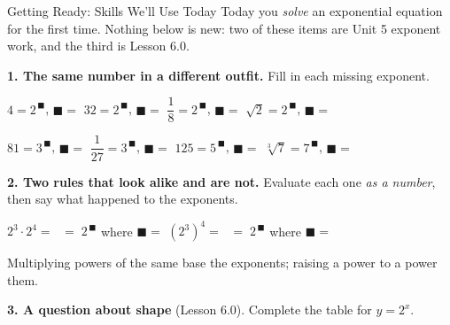 \documentclass[10pt]{article}
\begin{document}
\namedateperiod

\vspace{0.10in}

\begin{notesbox}{Getting Ready: Skills We'll Use Today}
\small Today you \emph{solve} an exponential equation for the first time. Nothing below is new: two of
these items are Unit 5 exponent work, and the third is Lesson 6.0.

\vspace{5pt}
\textbf{1. The same number in a different outfit.} Fill in each missing exponent.

\vspace{4pt}
\hspace*{1.2em} $4 = 2^{\,\blacksquare}$, \; $\blacksquare=$ \blank{1.1cm} \qquad
$32 = 2^{\,\blacksquare}$, \; $\blacksquare=$ \blank{1.1cm} \qquad
$\dfrac{1}{8} = 2^{\,\blacksquare}$, \; $\blacksquare=$ \blank{1.1cm} \qquad
$\sqrt{2} = 2^{\,\blacksquare}$, \; $\blacksquare=$ \blank{1.1cm}

\vspace{5pt}
\hspace*{1.2em} $81 = 3^{\,\blacksquare}$, \; $\blacksquare=$ \blank{1.1cm} \qquad
$\dfrac{1}{27} = 3^{\,\blacksquare}$, \; $\blacksquare=$ \blank{1.1cm} \qquad
$125 = 5^{\,\blacksquare}$, \; $\blacksquare=$ \blank{1.1cm} \qquad
$\sqrt[3]{7} = 7^{\,\blacksquare}$, \; $\blacksquare=$ \blank{1.1cm}

\vspace{0.32in}

\textbf{2. Two rules that look alike and are not.} Evaluate each one \emph{as a number}, then say what
happened to the exponents.

\vspace{4pt}
\hspace*{1.2em} $2^{3}\cdot 2^{4} =$ \blank{1.8cm} $\;=\; 2^{\,\blacksquare}$ where $\blacksquare=$
\blank{1.1cm} \qquad
$\left(2^{3}\right)^{4} =$ \blank{1.8cm} $\;=\; 2^{\,\blacksquare}$ where $\blacksquare=$
\blank{1.1cm}

\vspace{4pt}
\hspace*{1.2em} Multiplying powers of the same base \blank{2.2cm} the exponents; raising a power to a
power \blank{2.2cm} them.

\vspace{0.38in}

\textbf{3. A question about shape} (Lesson 6.0). Complete the table for $y=2^{x}$.


\end{notesbox}
\end{document}

